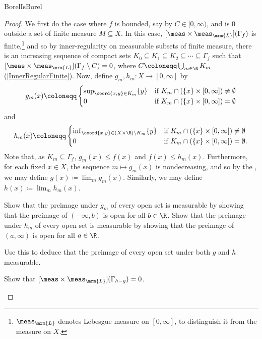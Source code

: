 \begin{prp}{}{BorelIsBorel}
\begin{proof}
We first do the case where $f$ is bounded, say by $C\in [0,\infty )$, and is $0$ outside a set of finite measure $M\subseteq X$.  In this case, $[\meas \times \meas _{\mrm{L}}](\Gamma _f)$ is finite,\footnote{$\meas _{\mrm{L}}$ denotes Lebesgue measure on $[0,\infty ]$, to distinguish it from the measure on $X$.} and so by inner-regularity on measurable subsets of finite measure, there is an increasing sequence of compact sets $K_0\subseteq K_1\subseteq K_2\subseteq \cdots \subseteq \Gamma _f$ such that $[\meas \times \meas _{\mrm{L}}](\Gamma _f\setminus C)=0$, where $C\coloneqq \bigcup _{m\in \N}K_m$ (\cref{InnerRegularFinite}).  Now, define $g_m,h_m:X\rightarrow [0,\infty ]$ by
\begin{equation}
g_m(x)\coloneqq \begin{cases}\sup _{\coord{x,y}\in K_m}\{ y\} & \text{if }K_m\cap (\{ x\} \times [0,\infty ])\neq \emptyset \\ 0 & \text{if }K_m\cap (\{ x\} \times [0,\infty ])=\emptyset \end{cases}
\end{equation}
and
\begin{equation}
h_m(x)\coloneqq \begin{cases}\inf _{\coord{x,y}\in (X\times \R )\setminus K_m}\{ y\} & \text{if }K_m\cap (\{ x\} \times [0,\infty ])\neq \emptyset \\ 0 & \text{if }K_m\cap (\{ x\} \times [0,\infty ])=\emptyset .\end{cases}
\end{equation}
Note that, as $K_m\subseteq \Gamma _f$, $g_m(x)\leq f(x)$ and $f(x)\leq h_m(x)$. Furthermore, for each fixed $x\in X$, the sequence $m\mapsto g_m(x)$ is nondecreasing, and so by the , we may define $g(x)\coloneqq \lim _mg_m(x)$.  Similarly, we may define $h(x)\coloneqq \lim _mh_m(x)$.
\begin{exr}[breakable=false]{}{}
Show that the preimage under $g_m$ of every open set is measurable by showing that the preimage of $(-\infty ,b)$ is open for all $b\in \R$.  Show that the preimage under $h_m$ of every open set is measurable by showing that the preimage of $(a,\infty )$ is open for all $a\in \R$.
\end{exr}
\begin{exr}[breakable=false]{}{}
Use this to deduce that the preimage of every open set under both $g$ and $h$ measurable.
\end{exr}
\begin{exr}[breakable=false]{}{}
Show that $[\meas \times \meas _{\mrm{L}}](\Gamma _{h-g})=0$.

\end{exr}
\end{proof}
\end{prp}
